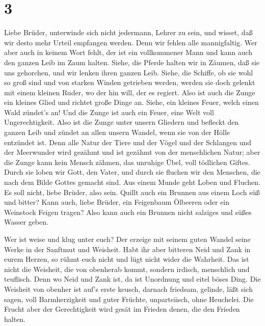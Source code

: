 \hypertarget{section-2}{%
\section{3}\label{section-2}}

 Liebe Brüder, unterwinde sich nicht jedermann, Lehrer zu
sein, und wisset, daß wir desto mehr Urteil empfangen werden.
 Denn wir fehlen alle mannigfaltig. Wer aber auch in keinem
Wort fehlt, der ist ein vollkommener Mann und kann auch den ganzen Leib
im Zaum halten.  Siehe, die Pferde halten wir in Zäumen, daß
sie uns gehorchen, und wir lenken ihren ganzen Leib.  Siehe,
die Schiffe, ob sie wohl so groß sind und von starken Winden getrieben
werden, werden sie doch gelenkt mit einem kleinen Ruder, wo der hin
will, der es regiert.  Also ist auch die Zunge ein kleines
Glied und richtet große Dinge an. Siehe, ein kleines Feuer, welch einen
Wald zündet's an!  Und die Zunge ist auch ein Feuer, eine
Welt voll Ungerechtigkeit. Also ist die Zunge unter unsern Gliedern und
befleckt den ganzen Leib und zündet an allen unsern Wandel, wenn sie von
der Hölle entzündet ist.  Denn alle Natur der Tiere und der
Vögel und der Schlangen und der Meerwunder wird gezähmt und ist gezähmt
von der menschlichen Natur;  aber die Zunge kann kein Mensch
zähmen, das unruhige Übel, voll tödlichen Giftes.  Durch sie
loben wir Gott, den Vater, und durch sie fluchen wir den Menschen, die
nach dem Bilde Gottes gemacht sind.  Aus einem Munde geht
Loben und Fluchen. Es soll nicht, liebe Brüder, also sein. 
Quillt auch ein Brunnen aus einem Loch süß und bitter? 
Kann auch, liebe Brüder, ein Feigenbaum Ölbeeren oder ein Weinstock
Feigen tragen? Also kann auch ein Brunnen nicht salziges und süßes
Wasser geben.

 Wer ist weise und klug unter euch? Der erzeige mit seinem
guten Wandel seine Werke in der Sanftmut und Weisheit. 
Habt ihr aber bitteren Neid und Zank in eurem Herzen, so rühmt euch
nicht und lügt nicht wider die Wahrheit.  Das ist nicht die
Weisheit, die von obenherab kommt, sondern irdisch, menschlich und
teuflisch.  Denn wo Neid und Zank ist, da ist Unordnung und
eitel böses Ding.  Die Weisheit von obenher ist auf's erste
keusch, darnach friedsam, gelinde, läßt sich sagen, voll Barmherzigkeit
und guter Früchte, unparteiisch, ohne Heuchelei.  Die
Frucht aber der Gerechtigkeit wird gesät im Frieden denen, die den
Frieden halten.

